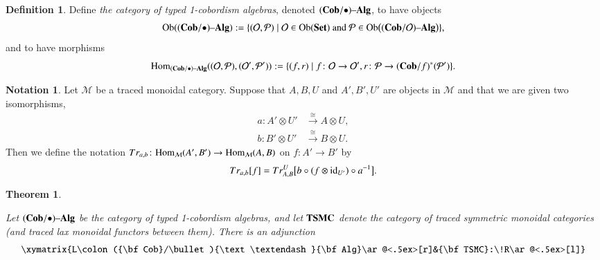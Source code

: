 \documentclass{amsart}
\def\tn{\textnormal}
\def\mc{\mathcal}
\def\Hom{\tn{Hom}}
\def\Ob{\tn{Ob}}
\def\to{\rightarrow}
\def\taking{\colon}
\def\iso{\cong}
\def\|{{\;|\;}}
\def\m1{{-1}}
\newcommand{\To}[1]{\xrightarrow{#1}}
\def\id{\tn{id}}
\def\Cob{{\bf Cob}}
\def\Set{{\bf Set}}
\def\alg{{\text \textendash}{\bf Alg}}
\def\mcM{\mc{M}}
\def\mcO{\mc{O}}
\def\mcP{\mc{P}}
\def\TSMC{{\bf TSMC}}
\newtheorem{theorem}[subsubsection]{Theorem}
\theoremstyle{remark}
\theoremstyle{definition}
\newtheorem{definition}[subsubsection]{Definition}
\newtheorem{notation}[subsubsection]{Notation}
\begin{document}
\begin{definition}

Define {\em the category of typed 1-cobordism algebras}, denoted $(\Cob/\bullet)\alg$, to have objects 
$$\Ob((\Cob/\bullet)\alg):=\{(\mcO,\mcP)\|\mcO\in\Ob(\Set)\tn{ and } \mcP\in\Ob\big((\Cob/\mcO)\alg\big)\},$$
and to have morphisms
$$\Hom_{(\Cob/\bullet)\alg}((\mcO,\mcP),(\mcO',\mcP')):=\{(f,r)\|f\taking\mcO\to\mcO', r\taking\mcP\to(\Cob/f)^*(\mcP')\}.$$

\end{definition}


\begin{notation}

Let $\mcM$ be a traced monoidal category. Suppose that $A,B,U$ and $A',B',U'$ are objects in $\mcM$ and that we are given two isomorphisms,
\begin{align*}
a\taking A'\otimes U'&\To{\iso}A\otimes U,\\ 
b\taking B'\otimes U'&\To{\iso}B\otimes U.
\end{align*}
Then we define the notation $Tr_{a,b}\taking\Hom_\mcM(A',B')\to\Hom_\mcM(A,B)$ on $f\taking A'\to B'$ by
$$Tr_{a,b}[f]=Tr^U_{A,B}\big[b\circ(f\otimes\id_{U'})\circ a^\m1\big].$$

\end{notation}

\begin{theorem}\label{thm:cobalg trace adjunction}

Let $(\Cob/\bullet)\alg$ be the category of typed 1-cobordism algebras, and let $\TSMC$ denote the category of traced symmetric monoidal categories (and traced lax monoidal functors between them). There is an adjunction
$$\xymatrix{L\taking(\Cob/\bullet)\alg\ar@<.5ex>[r]&\TSMC:\!R\ar@<.5ex>[l]}$$

\end{theorem}
\end{document}

